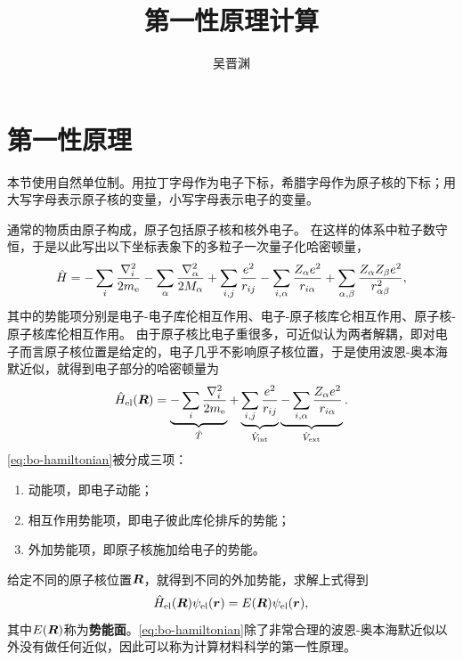 \documentclass[hyperref, UTF8, a4paper]{ctexart}
\title{第一性原理计算}
\author{吴晋渊}
\begin{document}
\maketitle

\section{第一性原理}

本节使用自然单位制。用拉丁字母作为电子下标，希腊字母作为原子核的下标；用大写字母表示原子核的变量，小写字母表示电子的变量。

通常的物质由原子构成，原子包括原子核和核外电子。
在这样的体系中粒子数守恒，于是以此写出以下坐标表象下的多粒子一次量子化哈密顿量，
\begin{equation}
    \hat{H} = - \sum_{i} \frac{\laplacian_i}{2 m_\text{e}} - \sum_{\alpha} \frac{\laplacian_\alpha}{2 M_\alpha}
    + \sum_{i, j} \frac{e^2}{r_{ij}} - \sum_{i, \alpha} \frac{Z_\alpha e^2}{r_{i\alpha}} + \sum_{\alpha, \beta} \frac{Z_\alpha Z_\beta e^2}{r_{\alpha \beta}^2},
\end{equation}
其中的势能项分别是电子-电子库伦相互作用、电子-原子核库仑相互作用、原子核-原子核库伦相互作用。
由于原子核比电子重很多，可近似认为两者解耦，即对电子而言原子核位置是给定的，电子几乎不影响原子核位置，于是使用波恩-奥本海默近似，就得到电子部分的哈密顿量为
\begin{equation}
    \hat{H}_\text{el}(\vb*{R}) = \underbrace{- \sum_{i} \frac{\laplacian_i}{2 m_\text{e}}}_{\hat{T}} + \underbrace{\sum_{i, j} \frac{e^2}{r_{ij}}}_{\hat{V}_\text{int}} \underbrace{- \sum_{i, \alpha} \frac{Z_\alpha e^2}{r_{i\alpha}}}_{\hat{V}_\text{ext}}.
    \label{eq:bo-hamiltonian}
\end{equation}
\eqref{eq:bo-hamiltonian}被分成三项：
\begin{enumerate}
    \item 动能项，即电子动能；
    \item 相互作用势能项，即电子彼此库伦排斥的势能；
    \item 外加势能项，即原子核施加给电子的势能。
\end{enumerate}
给定不同的原子核位置$\vb*{R}$，就得到不同的外加势能，求解上式得到
\begin{equation}
    \hat{H}_\text{el}(\vb*{R}) \psi_\text{el}(\vb*{r}) = E(\vb*{R}) \psi_\text{el}(\vb*{r}),
\end{equation}
其中$E(\vb*{R})$称为\textbf{势能面}。\eqref{eq:bo-hamiltonian}除了非常合理的波恩-奥本海默近似以外没有做任何近似，因此可以称为计算材料科学的第一性原理。
\end{document}
